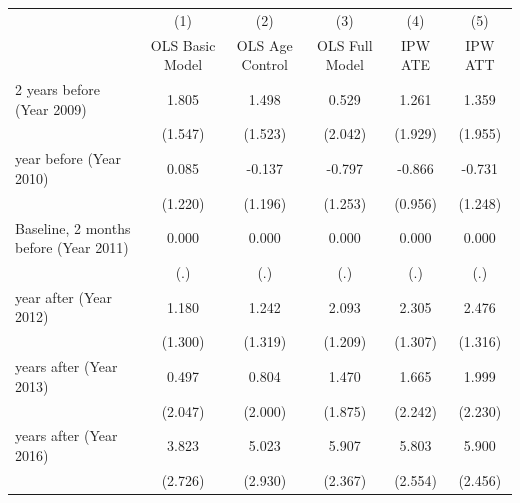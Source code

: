 \documentclass[serif, aspectratio=169]{beamer}
\begin{document}
\begin{frame}
\begin{table}[htbp]
\begin{tabular}{@{\extracolsep{5pt}}lccccc}
            &\multicolumn{1}{c}{(1)}&\multicolumn{1}{c}{(2)}&\multicolumn{1}{c}{(3)}&\multicolumn{1}{c}{(4)}&\multicolumn{1}{c}{(5)}\\
            &\multicolumn{1}{c}{OLS Basic Model}&\multicolumn{1}{c}{OLS Age Control}&\multicolumn{1}{c}{OLS Full Model}&\multicolumn{1}{c}{IPW ATE}&\multicolumn{1}{c}{IPW ATT}\\
\midrule
2 years before (Year 2009)&       1.805         &       1.498         &       0.529         &       1.261         &       1.359         \\
            &     (1.547)         &     (1.523)         &     (2.042)         &     (1.929)         &     (1.955)         \\
\addlinespace
1 year before (Year 2010)&       0.085         &      -0.137         &      -0.797         &      -0.866         &      -0.731         \\
            &     (1.220)         &     (1.196)         &     (1.253)         &     (0.956)         &     (1.248)         \\
\addlinespace
Baseline, 2 months before (Year 2011)&       0.000         &       0.000         &       0.000         &       0.000         &       0.000         \\
            &         (.)         &         (.)         &         (.)         &         (.)         &         (.)         \\
\addlinespace
1 year after (Year 2012)&       1.180         &       1.242         &       2.093\sym{*}  &       2.305\sym{*}  &       2.476\sym{*}  \\
            &     (1.300)         &     (1.319)         &     (1.209)         &     (1.307)         &     (1.316)         \\
\addlinespace
2 years after (Year 2013)&       0.497         &       0.804         &       1.470         &       1.665         &       1.999         \\
            &     (2.047)         &     (2.000)         &     (1.875)         &     (2.242)         &     (2.230)         \\
\addlinespace
5 years after (Year 2016)&       3.823         &       5.023\sym{*}  &       5.907\sym{**} &       5.803\sym{**} &       5.900\sym{**} \\
            &     (2.726)         &     (2.930)         &     (2.367)         &     (2.554)         &     (2.456)         \\

\end{tabular}
\end{table}
\end{frame}
\end{document}
